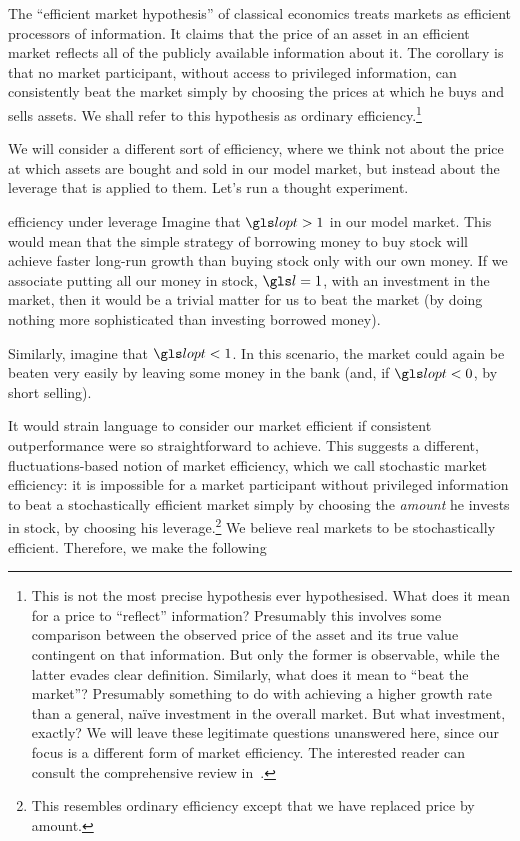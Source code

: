 The ``efficient market hypothesis'' of classical economics treats markets as efficient processors of information. It claims that the price of an asset in an efficient market reflects all of the publicly available information about it. The corollary is that no market participant, without access to privileged information, can consistently beat the market simply by choosing the prices at which he buys and sells assets. We shall refer to this hypothesis as ordinary efficiency.\footnote{This is not the most precise hypothesis ever hypothesised. What does it mean for a price to ``reflect'' information? Presumably this involves some comparison between the observed price of the asset and its true value contingent on that information. But only the former is observable, while the latter evades clear definition. Similarly, what does it mean to ``beat the market''? Presumably something to do with achieving a higher growth rate than a general, na\"{i}ve investment in the overall market. But what investment, exactly? We will leave these legitimate questions unanswered here, since our focus is a different form of market efficiency. The interested reader can consult the comprehensive review in~\cite{Sewell2011}.}

We will consider a different sort of efficiency, where we think not about the price at which assets are bought and sold in our model market, but instead about the leverage that is applied to them. Let's run a thought experiment.

\begin{thoughtex}{efficiency under leverage}
Imagine that $\lopt>1$ in our model market. This would mean that the simple strategy of borrowing money to buy stock will achieve faster long-run growth than buying stock only with our own money. If we associate putting all our money in stock, $\l=1$, with an investment in the market, then it would be a trivial matter for us to beat the market (by doing nothing more sophisticated than investing borrowed money).

Similarly, imagine that $\lopt<1$. In this scenario, the market could again be beaten very easily by leaving some money in the bank (and, if $\lopt<0$, by short selling).
\end{thoughtex}

It would strain language to consider our market efficient if consistent outperformance were so straightforward to achieve. This suggests a different, fluctuations-based notion of market efficiency, which we call stochastic market efficiency: it is impossible for a market participant without privileged information to beat a stochastically efficient market simply by choosing the \textit{amount} he invests in stock, \ie by choosing his leverage.\footnote{This resembles ordinary efficiency except that we have replaced price by amount.} We believe real markets to be stochastically efficient. Therefore, we make the following

